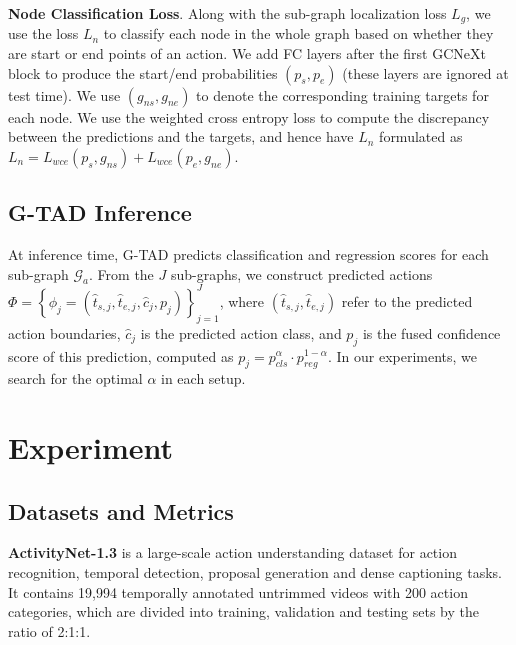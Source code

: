 \documentclass[10pt,twocolumn,letterpaper]{article}
\newcommand{\G}{\mathcal{G}}
\begin{document}
\noindent \textbf{Node Classification Loss}. Along with the sub-graph localization loss $L_{g}$, we use the loss $L_n$ to classify each node in the whole graph based on whether they are start or end points of an action. We add FC layers after the first GCNeXt block to produce the start/end probabilities $(p_s,p_e)$ (these layers are ignored at test time). 
We use $(g_{ns}, g_{ne})$ to denote the corresponding training targets for each node.
We use the weighted cross entropy loss to compute the discrepancy between the predictions and the targets, and hence have $L_n$ formulated as $L_{n}= {L}_{wce}({{p}}_s,{g}_{ns})+ {L}_{wce}({{p}}_e,{g}_{ne})$. 








\subsection{G-TAD Inference}
At inference time, G-TAD predicts classification and regression scores for each sub-graph $\G_{a}$. From the $J$ sub-graphs, we construct predicted actions $\Phi  = \left \{  \phi_j=(\hat{t}_{s,j}, \hat{t}_{e,j}, \hat{c}_j, p_j) \right \}_{j=1}^{J}$, where $(\hat{t}_{s,j}, \hat{t}_{e,j})$ refer to the predicted action boundaries, $\hat{c}_j$ is the predicted action class, and $p_j$ is the fused confidence score of this prediction, computed as $p_{j}=p_{cls}^\alpha \cdot p_{reg}^{1-\alpha}$. In our experiments, we search for the optimal $\alpha$ in each setup. 












%
 \section{Experiment}
\providecommand{\e}[1]{\ensuremath{\times 10^{#1}}}
\subsection{Datasets and Metrics}



\noindent
{\bf ActivityNet-1.3} \cite{caba2015activitynet}  is a large-scale action understanding dataset for action recognition, temporal detection, proposal generation and dense captioning tasks. It contains 19,994 temporally annotated untrimmed videos with 200 action categories, which are divided into training, validation and testing sets by the ratio of 2:1:1. 
\end{document}
